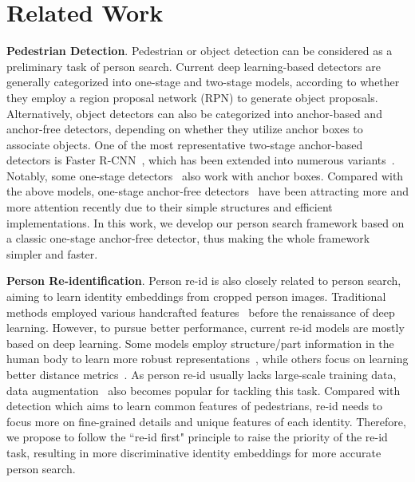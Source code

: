\documentclass[journal]{IEEEtran}
\begin{document}
\section{Related Work}
\textbf{Pedestrian Detection}. Pedestrian or object detection can be considered as a preliminary task of person search. Current deep learning-based detectors are generally categorized into one-stage and two-stage models, according to whether they employ a region proposal network (RPN) to generate object proposals. Alternatively, object detectors can also be categorized into anchor-based and anchor-free detectors, depending on whether they utilize anchor boxes to associate objects. One of the most representative two-stage anchor-based detectors is Faster R-CNN~\cite{DBLP:journals/pami/RenHG017}, which has been extended into numerous variants~\cite{DBLP:conf/iccv/DaiQXLZHW17,DBLP:conf/cvpr/CaiV18,DBLP:conf/cvpr/PangCSFOL19,DBLP:conf/cvpr/SongLW20}. Notably, some one-stage detectors~\cite{DBLP:conf/eccv/LiuAESRFB16,DBLP:conf/iccv/LinGGHD17,DBLP:conf/cvpr/RedmonF17,DBLP:conf/cvpr/ZhangWBLL18} also work with anchor boxes. Compared with the above models, one-stage anchor-free detectors~\cite{DBLP:conf/cvpr/RedmonDGF16,DBLP:conf/eccv/LawD18,DBLP:conf/cvpr/LiuLRHY19,DBLP:journals/corr/abs-1904-07850,DBLP:conf/iccv/YangLHWL19,DBLP:conf/iccv/TianSCH19,DBLP:conf/mm/LiLJ020} have been attracting more and more attention recently due to their simple structures and 
efficient implementations. In this work, we develop our person search framework based on a classic one-stage anchor-free detector, thus making the whole framework simpler and faster.    

\textbf{Person Re-identification}. Person re-id is also closely related to person search, aiming to learn identity embeddings from cropped person images. Traditional methods employed various handcrafted features~\cite{DBLP:journals/ijcv/Lowe04,DBLP:conf/cvpr/FarenzenaBPMC10,DBLP:conf/eccv/GrayT08} before the renaissance of deep learning. However, to pursue better performance, current re-id models are mostly based on deep learning. Some models employ structure/part information in the human body to learn more robust representations~\cite{DBLP:conf/iccv/SuLZX0T17,DBLP:conf/eccv/SunZYTW18,DBLP:conf/iccv/MiaoWLD019,9233968}, while others focus on learning better distance metrics~\cite{DBLP:conf/cvpr/AhmedJM15,DBLP:journals/corr/HermansBL17,DBLP:conf/cvpr/ChenCZH17,DBLP:journals/pami/ChenZZL18,DBLP:journals/pami/WangGZW16,DBLP:journals/tip/ZhuWHZ18}. As person re-id usually lacks large-scale training data, data augmentation~\cite{DBLP:conf/nips/GeLZYYWL18,DBLP:conf/cvpr/LiuNYZCH18,DBLP:conf/cvpr/WeiZ0018,DBLP:journals/tip/ZhongZZLY19} also becomes popular for tackling this task. Compared with detection which aims to learn common features of pedestrians, re-id needs to focus more on fine-grained details and unique features of each identity. Therefore, we propose to follow the ``re-id first" principle to raise the priority of the re-id task, resulting in more discriminative identity embeddings for more accurate person search.
\end{document}
